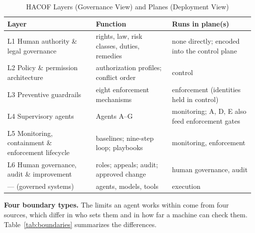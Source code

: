 \documentclass{ieeeaccess}
\newcommand{\hacof}{HACOF}
\begin{document}
\begin{table}[!t]
\caption{\hacof{} Layers (Governance View) and Planes (Deployment View)}
\label{tab:layers}
\centering
\footnotesize
\setlength{\tabcolsep}{3pt}
\begin{tabular}{>{\raggedright\arraybackslash}p{2.35cm}>{\raggedright\arraybackslash}p{2.5cm}>{\raggedright\arraybackslash}p{2.3cm}}
\toprule
\rowcolor{darkblue!15}
\textbf{Layer} & \textbf{Function} & \textbf{Runs in plane(s)} \\
\midrule
L1 Human authority \& legal governance & rights, law, risk classes, duties, remedies & none directly; encoded into the control plane \\
\rowcolor{darkblue!5}
L2 Policy \& permission architecture & authorization profiles; conflict order & control \\
L3 Preventive guardrails & eight enforcement mechanisms & enforcement (identities held in control) \\
\rowcolor{darkblue!5}
L4 Supervisory agents & Agents A--G & monitoring; A, D, E also feed enforcement gates \\
L5 Monitoring, containment \& enforcement lifecycle & baselines; nine-step loop; playbooks & monitoring, enforcement \\
\rowcolor{darkblue!5}
L6 Human governance, audit \& improvement & roles; appeals; audit; approved change & human governance, audit \\
--- (governed systems) & agents, models, tools & execution \\
\bottomrule
\end{tabular}
\end{table}

\textbf{Four boundary types.} The limits an agent works within come from four sources, which differ in who sets them and in how far a machine can check them. Table~\ref{tab:boundaries} summarizes the differences.
\end{document}
